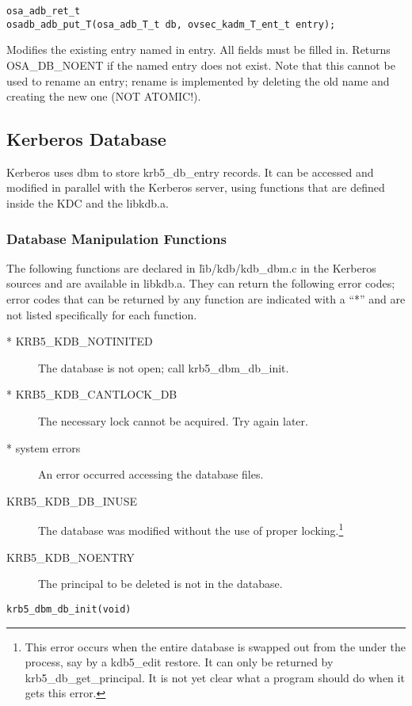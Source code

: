 \begin{verbatim}
osa_adb_ret_t
osadb_adb_put_T(osa_adb_T_t db, ovsec_kadm_T_ent_t entry);
\end{verbatim}

Modifies the existing entry named in entry.  All fields must be filled
in.  Returns OSA_DB_NOENT if the named entry does not exist.  Note
that this cannot be used to rename an entry; rename is implemented by
deleting the old name and creating the new one (NOT ATOMIC!).

\subsection{Kerberos Database}

Kerberos uses dbm to store krb5_db_entry records.  It can be accessed
and modified in parallel with the Kerberos server, using functions
that are defined inside the KDC and the libkdb.a.

\subsubsection{Database Manipulation Functions}

The following functions are declared in \v{lib/kdb/kdb_dbm.c} in the
Kerberos sources and are available in libkdb.a.  They can return the
following error codes; error codes that can be returned by any
function are indicated with a ``*'' and are not listed specifically
for each function.

\begin{description}
\item[* KRB5_KDB_NOTINITED] The database is not open; call
krb5_dbm_db_init.
\item[* KRB5_KDB_CANTLOCK_DB] The necessary lock cannot be acquired.  Try
again later.
\item[* system errors] An error occurred accessing the database files.
\item[KRB5_KDB_DB_INUSE] The database was modified without the use
of proper locking.\footnote{This error occurs when the entire database
is swapped out from the under the process, say by a kdb5_edit restore.
It can only be returned by krb5_db_get_principal.  It is not yet clear
what a program should do when it gets this error.}
\item[KRB5_KDB_NOENTRY] The principal to be deleted is not
in the database.
\end{description}

\begin{verbatim}
krb5_dbm_db_init(void)
\end{verbatim}

